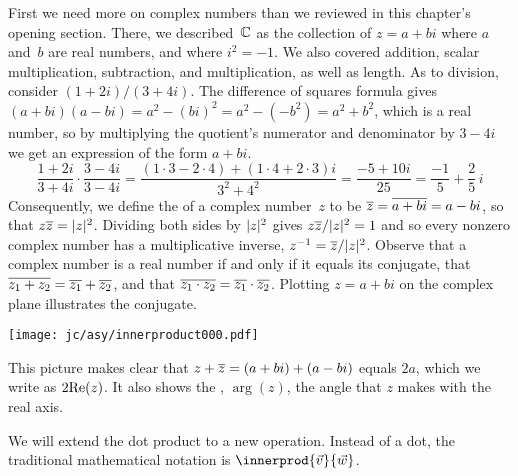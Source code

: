 First we need more on complex numbers than we reviewed in this
chapter's opening section.
There, we described~$\mathbb{C}$ as 
the collection of $z=a+bi$ where $a$ and~$b$ are real numbers,
and where $i^2=-1$. 
We also covered addition, scalar multiplication,
subtraction, and multiplication, as well as length.
As to division,  consider $(1+2i)/(3+4i)$.
The difference of squares formula
gives $(a+bi)(a-bi)=a^2-(bi)^2=a^2-(-b^2)=a^2+b^2$,
which is a real number,
so
by multiplying the quotient's numerator and denominator by $3-4i$
we get an expression of the form $a+bi$.
\begin{equation*}
  \frac{1+2i}{3+4i}\cdot\frac{3-4i}{3-4i}
  =
  \frac{(1\cdot 3-2\cdot 4)+(1\cdot 4+2\cdot 3)i}{3^2+4^2}
  =
  \frac{-5+10i}{25}
  =
  \frac{-1}{5}+\frac{2}{5}\,i
\end{equation*}
Consequently, we define the  of a complex number~$z$
to be $\overline{z}=\overline{a+bi}=a-bi$, so that $z\overline{z}=\lvert z\rvert^2$.
Dividing both sides by $\lvert z\rvert^2$ gives $z\overline{z}/\lvert z\rvert^2=1$
and so  
every nonzero complex number has a multiplicative inverse,
$z^{-1}=\overline{z}/\lvert z\rvert^2$.
Observe that a complex number is a real number if and only if 
it equals its conjugate, 
that $\overline{z_1+z_2}=\overline{z_1}+\overline{z_2}$,
and that $\overline{z_1\cdot z_2}=\overline{z_1}\cdot\overline{z_2}$.
Plotting $z=a+bi$ on the 
complex plane 
illustrates the conjugate.
\begin{center}
  \texttt{[image: jc/asy/innerproduct000.pdf]}
\end{center}
This picture makes clear that $z+\overline{z}=(a+bi)+(a-bi)$ equals
$2a$, which we write as $2\mathrm{Re}(z)$.
It also shows the , $\arg(z)$, the angle that
$z$ makes with the real axis.

We will extend the dot product to a new operation.
Instead of a dot, the traditional mathematical notation is
$\innerprod{\vec{v}}{\vec{w}}$.

